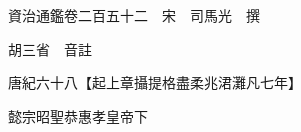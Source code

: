 










 


 
 


 

  
  
  
  
  





  
  
  
  
  
 
  

  

  
  
  



  

 
 

  
   




  

  
  


  　　資治通鑑卷二百五十二　宋　司馬光　撰

　　胡三省　音註

　　唐紀六十八【起上章攝提格盡柔兆涒灘凡七年】

　　懿宗昭聖恭惠孝皇帝下

